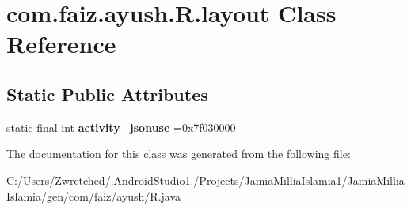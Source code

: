 \hypertarget{classcom_1_1faiz_1_1ayush_1_1_r_1_1layout}{}\section{com.\+faiz.\+ayush.\+R.\+layout Class Reference}
\label{classcom_1_1faiz_1_1ayush_1_1_r_1_1layout}
\subsection*{Static Public Attributes}
\begin{DoxyCompactItemize}
\item 
\hypertarget{classcom_1_1faiz_1_1ayush_1_1_r_1_1layout_ad1d167b2f37f95836a2ea81517093ea3}{}static final int {\bfseries activity\+\_\+jsonuse} =0x7f030000\label{classcom_1_1faiz_1_1ayush_1_1_r_1_1layout_ad1d167b2f37f95836a2ea81517093ea3}

\end{DoxyCompactItemize}


The documentation for this class was generated from the following file\+:\begin{DoxyCompactItemize}
\item 
C\+:/\+Users/\+Zwretched/.\+Android\+Studio1./\+Projects/\+Jamia\+Millia\+Islamia1/\+Jamia\+Millia\+Islamia/gen/com/faiz/ayush/R.\+java\end{DoxyCompactItemize}

